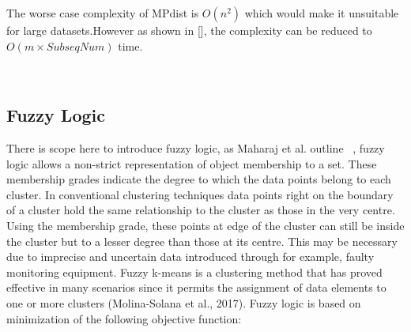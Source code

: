 The worse case complexity of MPdist is $O(n^2)$ which would make it unsuitable for large datasets.However as shown in [], the complexity can be reduced to $O(m \times SubseqNum)$ time.

\\




\subsection{Fuzzy Logic}
There is scope here to introduce fuzzy logic, as  Maharaj et al. outline ~\cite{MAHARAJ20111187}, fuzzy logic allows a non-strict representation of object membership to a set. These membership grades indicate the degree to which the data points belong to each cluster. In conventional clustering techniques data points right on the boundary of a cluster hold the same relationship to the cluster as those in the very centre. Using the membership grade, these points at edge of the cluster can still be inside the cluster but to a lesser degree than those at its centre. This may be necessary due to imprecise and uncertain data introduced through for example, faulty monitoring equipment. Fuzzy k-means is a clustering method that has proved effective in many scenarios since it permits the assignment of data elements to one or more clusters (Molina-Solana et al., 2017). Fuzzy logic is based on minimization of the following objective function:

